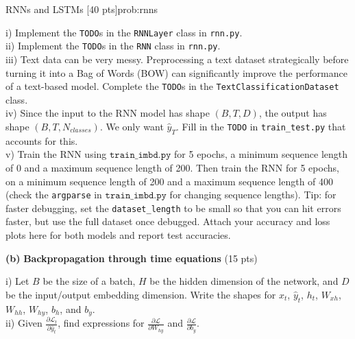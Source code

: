 \begin{problem}{RNNs and LSTMs \hfill [40 pts]}{prob:rnns}
\begin{adjustwidth}{2em}{2em}
    
    \begin{adjustwidth}{2em}{2em}
    i) Implement the \texttt{TODO}s in the \texttt{RNNLayer} class in \texttt{rnn.py}. \\

    ii) Implement the \texttt{TODO}s in the \texttt{RNN} class in \texttt{rnn.py}. \\
    
    iii) Text data can be very messy. Preprocessing a text dataset strategically before turning it into a Bag of Words (BOW) can significantly improve the performance of a text-based model. Complete the \texttt{TODO}s in the \texttt{TextClassificationDataset} class. \\

    iv) Since the input to the RNN model has shape $(B, T, D)$, the output has shape $(B, T, N_{classes})$. We only want $\hat{y}_T$. Fill in the \texttt{TODO} in \texttt{train\_test.py} that accounts for this. \\

    v) Train the RNN using $\texttt{train\_imbd.py}$ for 5 epochs, a minimum sequence length of 0 and a maximum sequence length of 200. Then train the RNN for 5 epochs, on a minimum sequence length of 200 and a maximum sequence length of 400 (check the \texttt{argparse} in $\texttt{train\_imbd.py}$ for changing sequence lengths). Tip: for faster debugging, set the \texttt{dataset\_length} to be small so that you can hit errors faster, but use the full dataset once debugged. Attach your accuracy and loss plots here for both models and report test accuracies. \\
     

    \end{adjustwidth} 
    \vspace{5px}

    \textbf{(b)} \textbf{Backpropagation through time equations} \hfill (15 pts)
    \begin{adjustwidth}{2em}{2em}

    i) Let $B$ be the size of a batch, $H$ be the hidden dimension of the network, and $D$ be the input/output embedding dimension. Write the shapes for $x_t$, $\hat{y}_t$, $h_t$, $W_{xh}$, $W_{hh}$, $W_{hy}$, $b_h$, and $b_y$. \\

    ii) Given $\frac{\partial \mathcal{L}_t}{\partial \hat{y}_t}$, find expressions for $\frac{\partial \mathcal{L}}{\partial W_{hy}}$ and $\frac{\partial \mathcal{L}}{\partial b_{y}}$. \\


\end{adjustwidth}
\end{adjustwidth}
\end{problem}
